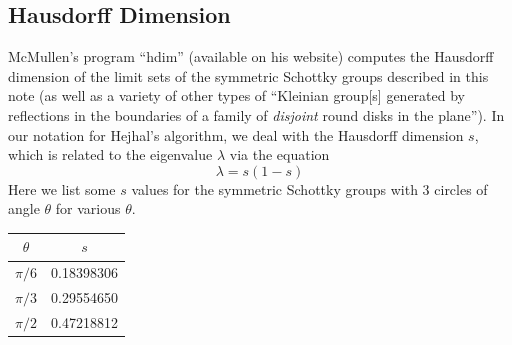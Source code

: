 \documentclass[]{article}
\begin{document}
\subsection*{Hausdorff Dimension}

McMullen's program ``hdim'' (available on his website) computes the Hausdorff dimension of the limit sets of the symmetric Schottky groups described in this note (as well as a variety of other types of ``Kleinian group[s] generated by reflections in the boundaries of a family of \textit{disjoint} round disks in the plane'').
In our notation for Hejhal's algorithm, we deal with the Hausdorff dimension $s$, which is related to the eigenvalue $\lambda$ via the equation
$$
\lambda = s(1 - s)
$$
Here we list some $s$ values for the symmetric Schottky groups with 3 circles of angle $\theta$ for various $\theta$.
\begin{center}
	\begin{tabular}{c|c}
		$\theta$ & $s$ \\
		\hline
		$\pi/6$ & 0.18398306 \\
		$\pi/3$ & 0.29554650 \\
		$\pi/2$ & 0.47218812
	\end{tabular}
\end{center}
\end{document}
